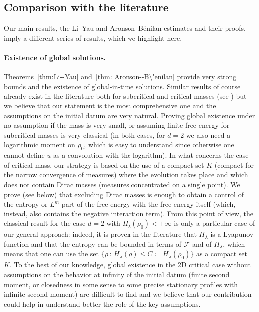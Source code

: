 \documentclass[11pt,a4paper]{article}
\numberwithin{equation}{section}
\theoremstyle{plain}
\theoremstyle{remark}
\begin{document}
\subsection{Comparison with the literature}

Our main results, the Li--Yau and Aronson--B\'enilan estimates and their proofs, imply a different series of results, which we highlight here. 

\paragraph{Existence of global solutions.}

Theorems~\ref{thm:Li--Yau} and~\ref{thm: Aronson--B\'enilan} provide very strong bounds and the existence of global-in-time solutions. Similar results of course already exist in the literature both for subcritical and critical masses (see \cite{Blanchet_Dolbeault_Perthame06, Blanchet_Carrillo_Masmoudi08, Blanchet_Dolbeault_Escobedo_Fernandez10, Campos_Dolbeault14}) but we believe that our statement is the most comprehensive one and the assumptions on the initial datum are very natural. Proving global existence under no assumption if the mass is very small, or assuming finite free energy for subcritical masses is very classical (in both cases, for $d=2$ we also need a logarithmic moment on $\rho_0$, which is easy to understand since otherwise one cannot define $u$ as a convolution with the logarithm). In what concerns the case of critical mass, our strategy is based on the use of a compact set $K$ (compact for the narrow convergence of measures) where the evolution takes place and which does not contain Dirac masses (measures concentrated on a single point). We prove (see below) that excluding Dirac masses is enough to obtain a control of the entropy or $L^m$ part of the free energy with the free energy itself (which, instead, also contains the negative interaction term). From this point of view, the classical result for the case $d=2$ with $H_\lambda(\rho_0)<+\infty$ is only a particular case of our general approach: indeed, it is proven in the literature that $H_\lambda$ is a Lyapunov function and that the entropy can be bounded in terms of $\mathcal F$ and of $H_\lambda$, which means that one can use the set $\{\rho\,:\, H_\lambda(\rho)\leq C\coloneq H_\lambda(\rho_0)\}$ as a compact set $K$. To the best of our knowledge, global existence in the 2D critical case without assumptions on the behavior at infinity of the initial datum (finite second moment, or closedness in some sense to some precise stationary profiles with infinite second moment) are difficult to find and we believe that our contribution could help in understand better the role of the key assumptions.
\end{document}
